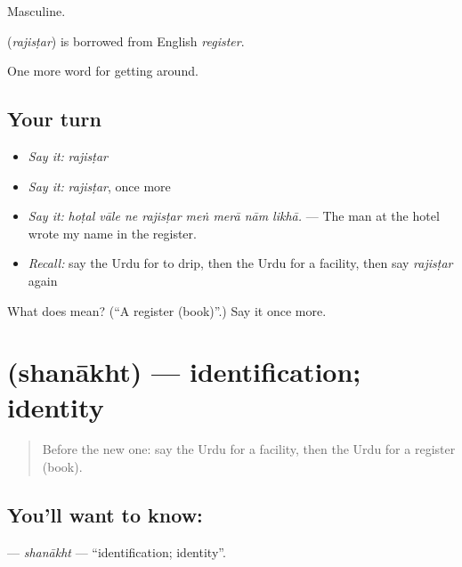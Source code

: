 Masculine.

\begin{cousinweb}
\textbf{} (\emph{rajisṭar}) is borrowed from English \emph{register}.
\end{cousinweb}

\begin{grammarlens}[title={What you've built}]
One more word for getting around.
\end{grammarlens}

\subsection*{Your turn}
\begin{itemize}
\raggedright
  \item \emph{Say it:} \emph{rajisṭar}
  \item \emph{Say it:} \emph{rajisṭar}, once more
  \item \emph{Say it:} \emph{hoṭal vāle ne rajisṭar meṅ merā nām likhā.} — The man at the hotel wrote my name in the register.
  \item \emph{Recall:} say the Urdu for to drip, then the Urdu for a facility, then say \emph{rajisṭar} again
\end{itemize}

\begin{tcolorbox}[breakable,colback=teal!4,colframe=teal!35!black,title={Before you move on}]
What does  mean? (\textquotedblleft{}A register (book)\textquotedblright{}.) Say it once more.
\end{tcolorbox}
\section[\texorpdfstring{\ur{شناخت} (shanākht)}{شناخت (shanākht)}]{ (shanākht) — identification; identity}

\label{lesson:UR-C405-shanakht}



\begin{quote}
Before the new one: say the Urdu for a facility, then the Urdu for a register (book).
\end{quote}

\subsection*{You'll want to know: }
\textbf{} — \emph{shanākht} — \textquotedblleft{}identification; identity\textquotedblright{}.

